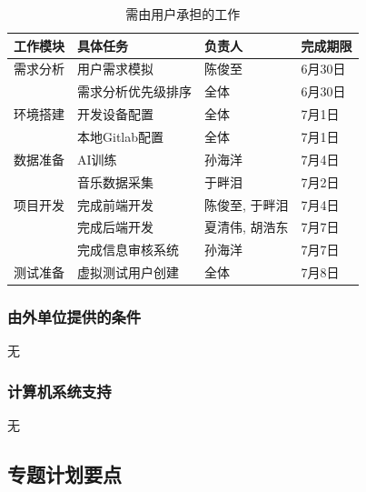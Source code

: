 \documentclass{base}
\numberwithin{figure}{section} %
\begin{document}
\begin{longtable}{@{}llll@{}}
\caption{需由用户承担的工作}
\label{tab:my-table}\\
\toprule
\textbf{工作模块} & \textbf{具体任务} & \textbf{负责人} & \textbf{完成期限} \\* \midrule
\endhead
%
\bottomrule
\endfoot
%
\endlastfoot
%
需求分析          & 用户需求模拟        & 陈俊至          & 6月30日         \\
              & 需求分析优先级排序     & 全体           & 6月30日         \\
环境搭建          & 开发设备配置        & 全体           & 7月1日          \\
              & 本地Gitlab配置    & 全体           & 7月1日          \\
数据准备          & AI训练          & 孙海洋          & 7月4日          \\
              & 音乐数据采集        & 于畔泪          & 7月2日          \\
项目开发          & 完成前端开发        & 陈俊至, 于畔泪     & 7月4日          \\
              & 完成后端开发        & 夏清伟, 胡浩东     & 7月7日          \\
              & 完成信息审核系统      & 孙海洋          & 7月7日          \\
测试准备          & 虚拟测试用户创建      & 全体           & 7月8日          \\* \bottomrule
\end{longtable}

\subsubsection{由外单位提供的条件}

无

\subsubsection{计算机系统支持}

无

\subsection{专题计划要点}
\end{document}
